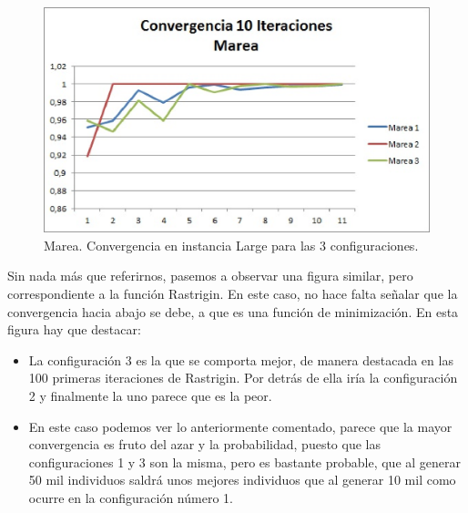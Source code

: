 \documentclass[runningheads]{llncs}
\begin{document}
\begin{figure}[h]
  \begin{center}
  \includegraphics[scale=0.7]{images/Marea.eps}
  \caption {Marea. Convergencia en instancia Large para las 3 configuraciones.} 
  \label{GraficaMarea}
 \end{center}
\end{figure}

Sin nada más que referirnos, pasemos a observar una figura similar, pero correspondiente a la función Rastrigin. En este caso, 
no hace falta señalar que la convergencia hacia abajo se debe, a que es una función de minimización. En esta figura hay que destacar:

\begin{itemize}
 \item La configuración 3 es la que se comporta mejor, de manera destacada en las 100 primeras iteraciones de Rastrigin. Por detrás 
 de ella iría la configuración 2 y finalmente la uno parece que es la peor.
 \item En este caso podemos ver lo anteriormente comentado, parece que la mayor convergencia es fruto del azar y 
 la probabilidad, puesto que las configuraciones 1 y 3 son la misma, pero es bastante probable, que al generar 50 mil individuos 
 saldrá unos mejores individuos que al generar 10 mil como ocurre en la configuración número 1.
\end{itemize}
\end{document}
